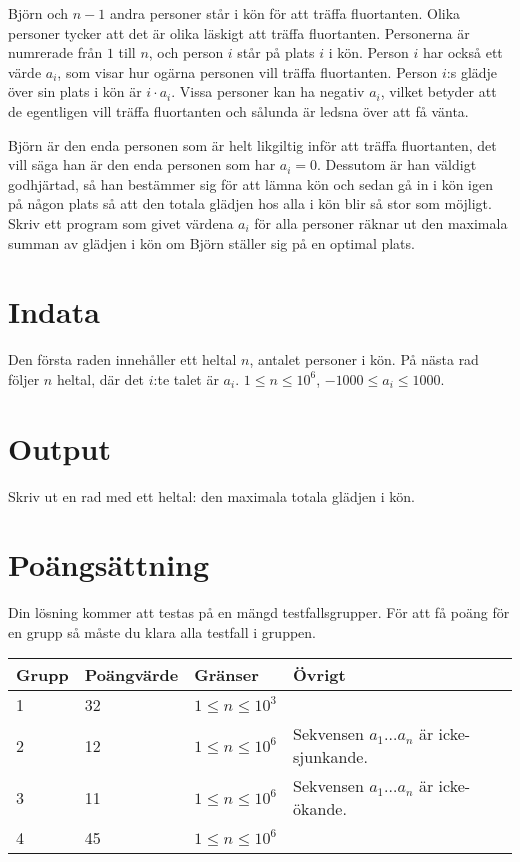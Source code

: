 Björn och $n-1$ andra personer står i kön för att träffa fluortanten. Olika personer tycker att det är olika läskigt att träffa fluortanten. Personerna är numrerade från $1$ till $n$, och person $i$ står på plats $i$ i kön. Person $i$ har också ett värde $a_i$, som visar hur ogärna personen vill träffa fluortanten. Person $i$:s glädje över sin plats i kön är $i \cdot a_i$. Vissa personer kan ha negativ $a_i$,
vilket betyder att de egentligen vill träffa fluortanten och sålunda är ledsna över att få vänta.

Björn är den enda personen som är helt likgiltig inför att träffa fluortanten, det vill säga han är den enda personen som har $a_i = 0$. Dessutom är han väldigt godhjärtad, så han bestämmer sig för att lämna kön och sedan gå in i kön igen på någon plats så att den totala glädjen hos alla i kön blir så stor som möjligt. Skriv ett program som givet värdena $a_i$ för alla personer räknar ut den maximala summan av glädjen i kön om Björn ställer sig på en optimal plats.

\section*{Indata}
Den första raden innehåller ett heltal $n$, antalet personer i kön. På nästa rad följer $n$ heltal, där det $i$:te talet är $a_i$. $1 \leq n \leq 10^6$, $-1000 \leq a_i \leq 1000$.

\section*{Output}
Skriv ut en rad med ett heltal: den maximala totala glädjen i kön.

\section*{Poängsättning}
Din lösning kommer att testas på en mängd testfallsgrupper. För att få poäng för en grupp så måste du klara alla testfall i gruppen.

\noindent
\begin{tabular}{|l|l|l|l|}
\hline
Grupp & Poängvärde & Gränser & Övrigt \\ \hline
1     & 32         & $1 \leq n \leq 10^3$ & \\ \hline
2     & 12         & $1 \leq n \leq 10^6$ & Sekvensen $a_1 \dots a_n$ är icke-sjunkande. \\ \hline
3     & 11         & $1 \leq n \leq 10^6$ & Sekvensen $a_1 \dots a_n$ är icke-ökande. \\ \hline
4     & 45         & $1 \leq n \leq 10^6$ & \\ \hline
\end{tabular}

